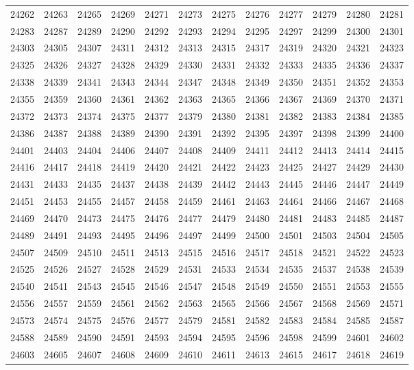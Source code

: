 \begin{center}
\begin{longtable}{llllllllllll}
24262 &24263 &24265 &24269 &24271 &24273 &24275 &24276 &24277 &24279 &24280 &24281 \\
24283 &24287 &24289 &24290 &24292 &24293 &24294 &24295 &24297 &24299 &24300 &24301 \\
24303 &24305 &24307 &24311 &24312 &24313 &24315 &24317 &24319 &24320 &24321 &24323 \\
24325 &24326 &24327 &24328 &24329 &24330 &24331 &24332 &24333 &24335 &24336 &24337 \\
24338 &24339 &24341 &24343 &24344 &24347 &24348 &24349 &24350 &24351 &24352 &24353 \\
24355 &24359 &24360 &24361 &24362 &24363 &24365 &24366 &24367 &24369 &24370 &24371 \\
24372 &24373 &24374 &24375 &24377 &24379 &24380 &24381 &24382 &24383 &24384 &24385 \\
24386 &24387 &24388 &24389 &24390 &24391 &24392 &24395 &24397 &24398 &24399 &24400 \\
24401 &24403 &24404 &24406 &24407 &24408 &24409 &24411 &24412 &24413 &24414 &24415 \\
24416 &24417 &24418 &24419 &24420 &24421 &24422 &24423 &24425 &24427 &24429 &24430 \\
24431 &24433 &24435 &24437 &24438 &24439 &24442 &24443 &24445 &24446 &24447 &24449 \\
24451 &24453 &24455 &24457 &24458 &24459 &24461 &24463 &24464 &24466 &24467 &24468 \\
24469 &24470 &24473 &24475 &24476 &24477 &24479 &24480 &24481 &24483 &24485 &24487 \\
24489 &24491 &24493 &24495 &24496 &24497 &24499 &24500 &24501 &24503 &24504 &24505 \\
24507 &24509 &24510 &24511 &24513 &24515 &24516 &24517 &24518 &24521 &24522 &24523 \\
24525 &24526 &24527 &24528 &24529 &24531 &24533 &24534 &24535 &24537 &24538 &24539 \\
24540 &24541 &24543 &24545 &24546 &24547 &24548 &24549 &24550 &24551 &24553 &24555 \\
24556 &24557 &24559 &24561 &24562 &24563 &24565 &24566 &24567 &24568 &24569 &24571 \\
24573 &24574 &24575 &24576 &24577 &24579 &24581 &24582 &24583 &24584 &24585 &24587 \\
24588 &24589 &24590 &24591 &24593 &24594 &24595 &24596 &24598 &24599 &24601 &24602 \\
24603 &24605 &24607 &24608 &24609 &24610 &24611 &24613 &24615 &24617 &24618 &24619 \\

\end{longtable}
\end{center}
